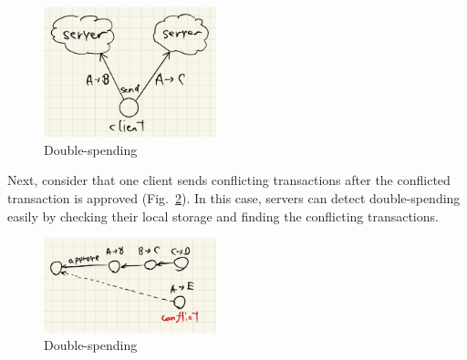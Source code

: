 \documentclass[a4j,10.5pt,uplatex,twocolumn]{article}
\begin{document}
\begin{figure}[tbp]
    \begin{center}
        \includegraphics[width=5.0cm]{./fig/double-spending-before.jpeg}
        \caption{Double-spending}
        \label{fig:double-spending-before}
    \end{center}
\end{figure}

Next, consider that one client sends conflicting transactions after the conflicted transaction is approved (Fig.~\ref{fig:double-spending-after}).
In this case, servers can detect double-spending easily by checking their local storage and finding the conflicting transactions.

\begin{figure}[tbp]
    \begin{center}
        \includegraphics[width=5.0cm]{./fig/double-spending-after.jpeg}
        \caption{Double-spending}
        \label{fig:double-spending-after}
    \end{center}
\end{figure}
\end{document}
